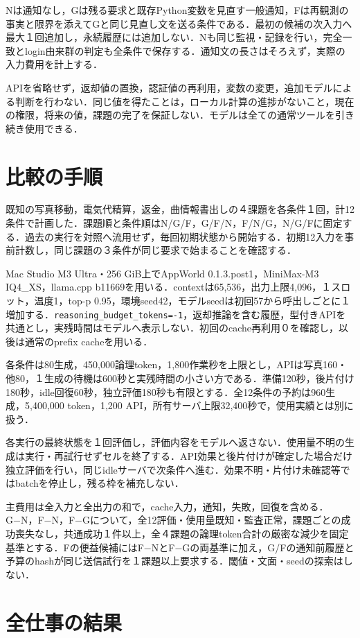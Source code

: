 \documentclass[uplatex,a4paper,twocolumn,10pt]{jsarticle}
\begin{document}
Nは通知なし，Gは残る要求と既存Python変数を見直す一般通知，Fは再観測の事実と限界を添えてGと同じ見直し文を送る条件である．最初の候補の次入力へ最大１回追加し，永続履歴には追加しない．Nも同じ監視・記録を行い，完全一致とlogin由来群の判定も全条件で保存する．通知文の長さはそろえず，実際の入力費用を計上する．

APIを省略せず，返却値の置換，認証値の再利用，変数の変更，追加モデルによる判断を行わない．同じ値を得たことは，ローカル計算の進捗がないこと，現在の権限，将来の値，課題の完了を保証しない．モデルは全ての通常ツールを引き続き使用できる．

\section{比較の手順}
既知の写真移動，電気代精算，返金，曲情報書出しの４課題を各条件１回，計12条件で計画した．課題順と条件順はN/G/F，G/F/N，F/N/G，N/G/Fに固定する．過去の実行を対照へ流用せず，毎回初期状態から開始する．初期12入力を事前計数し，同じ課題の３条件が同じ要求で始まることを確認する．

Mac Studio M3 Ultra・256 GiB上でAppWorld 0.1.3.post1，MiniMax-M3 IQ4\_XS，llama.cpp b11669を用いる．contextは65,536，出力上限4,096，１スロット，温度1，top-p 0.95，環境seed42，モデルseedは初回57から呼出しごとに１増加する．\texttt{reasoning\_budget\_tokens=-1}，返却推論を含む履歴，型付きAPIを共通とし，実残時間はモデルへ表示しない．初回のcache再利用０を確認し，以後は通常のprefix cacheを用いる．

各条件は80生成，450,000論理token，1,800作業秒を上限とし，APIは写真160・他80，１生成の待機は600秒と実残時間の小さい方である．準備120秒，後片付け180秒，idle回復60秒，独立評価180秒も有限とする．全12条件の予約は960生成，5,400,000 token，1,200 API，所有サーバ上限32,400秒で，使用実績とは別に扱う．

各実行の最終状態を１回評価し，評価内容をモデルへ返さない．使用量不明の生成は実行・再試行せずセルを終了する．API効果と後片付けが確定した場合だけ独立評価を行い，同じidleサーバで次条件へ進む．効果不明・片付け未確認等ではbatchを停止し，残る枠を補充しない．

主費用は全入力と全出力の和で，cache入力，通知，失敗，回復を含める．G−N，F−N，F−Gについて，全12評価・使用量既知・監査正常，課題ごとの成功喪失なし，共通成功１件以上，全４課題の論理token合計の厳密な減少を固定基準とする．Fの便益候補にはF−NとF−Gの両基準に加え，G/Fの通知前履歴と予算のhashが同じ送信試行を１課題以上要求する．閾値・文面・seedの探索はしない．

\section{全仕事の結果}

\end{document}
